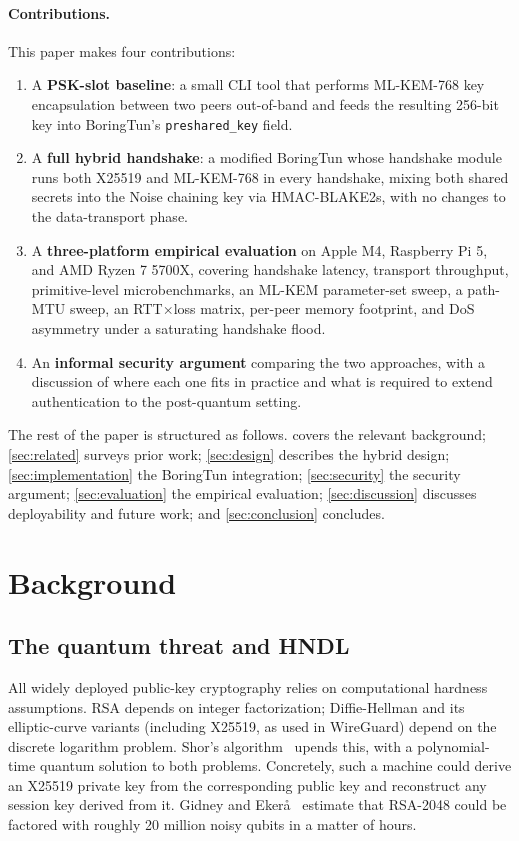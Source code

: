\documentclass[11pt,a4paper]{article}
\begin{document}
\paragraph{Contributions.}
This paper makes four contributions:
\begin{enumerate}[leftmargin=*,topsep=2pt,itemsep=2pt]
  \item A \textbf{PSK-slot baseline}: a small CLI tool that performs ML-KEM-768 key encapsulation between two peers out-of-band and feeds the resulting 256-bit key into BoringTun's \texttt{preshared\_key} field.
  \item A \textbf{full hybrid handshake}: a modified BoringTun whose handshake module runs both X25519 and ML-KEM-768 in every handshake, mixing both shared secrets into the Noise chaining key via HMAC-BLAKE2s, with no changes to the data-transport phase.
  \item A \textbf{three-platform empirical evaluation} on Apple M4, Raspberry Pi 5, and AMD Ryzen 7 5700X, covering handshake latency, transport throughput, primitive-level microbenchmarks, an ML-KEM parameter-set sweep, a path-MTU sweep, an RTT$\times$loss matrix, per-peer memory footprint, and DoS asymmetry under a saturating handshake flood.
  \item An \textbf{informal security argument} comparing the two approaches, with a discussion of where each one fits in practice and what is required to extend authentication to the post-quantum setting.
\end{enumerate}

The rest of the paper is structured as follows.
 covers the relevant background;
\cref{sec:related} surveys prior work;
\cref{sec:design} describes the hybrid design;
\cref{sec:implementation} the BoringTun integration;
\cref{sec:security} the security argument;
\cref{sec:evaluation} the empirical evaluation;
\cref{sec:discussion} discusses deployability and future work;
and \cref{sec:conclusion} concludes.

\section{Background}
\label{sec:background}

\subsection{The quantum threat and HNDL}

All widely deployed public-key cryptography relies on computational hardness assumptions. RSA depends on integer factorization; Diffie-Hellman and its elliptic-curve variants (including X25519, as used in WireGuard) depend on the discrete logarithm problem. Shor's algorithm~\cite{shor1994algorithms} upends this, with a polynomial-time quantum solution to both problems. Concretely, such a machine could derive an X25519 private key from the corresponding public key and reconstruct any session key derived from it. Gidney and Eker\aa~\cite{gidney2021factor} estimate that RSA-2048 could be factored with roughly 20 million noisy qubits in a matter of hours.
\end{document}

